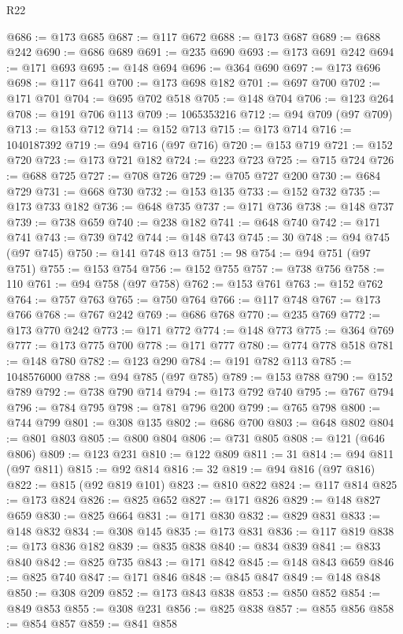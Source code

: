 \begin{lexlean}{R22}
\begin{coremodule}
@686 := @173 @685
@687 := @117 @672
@688 := @173 @687
@689 := @688 @242
@690 := @686 @689
@691 := @235 @690
@693 := @173 @691 @242
@694 := @171 @693
@695 := @148 @694
@696 := @364 @690
@697 := @173 @696
@698 := @117 @641
@700 := @173 @698 @182
@701 := @697 @700
@702 := @171 @701
@704 := @695 @702 @518
@705 := @148 @704
@706 := @123 @264
@708 := @191 @706 @113
@709 := 1065353216
@712 := @94 @709 (@97 @709)
@713 := @153 @712
@714 := @152 @713
@715 := @173 @714
@716 := 1040187392
@719 := @94 @716 (@97 @716)
@720 := @153 @719
@721 := @152 @720
@723 := @173 @721 @182
@724 := @223 @723
@725 := @715 @724
@726 := @688 @725
@727 := @708 @726
@729 := @705 @727 @200
@730 := @684 @729
@731 := @668 @730
@732 := @153 @135
@733 := @152 @732
@735 := @173 @733 @182
@736 := @648 @735
@737 := @171 @736
@738 := @148 @737
@739 := @738 @659
@740 := @238 @182
@741 := @648 @740
@742 := @171 @741
@743 := @739 @742
@744 := @148 @743
@745 := 30
@748 := @94 @745 (@97 @745)
@750 := @141 @748 @13
@751 := 98
@754 := @94 @751 (@97 @751)
@755 := @153 @754
@756 := @152 @755
@757 := @738 @756
@758 := 110
@761 := @94 @758 (@97 @758)
@762 := @153 @761
@763 := @152 @762
@764 := @757 @763
@765 := @750 @764
@766 := @117 @748
@767 := @173 @766
@768 := @767 @242
@769 := @686 @768
@770 := @235 @769
@772 := @173 @770 @242
@773 := @171 @772
@774 := @148 @773
@775 := @364 @769
@777 := @173 @775 @700
@778 := @171 @777
@780 := @774 @778 @518
@781 := @148 @780
@782 := @123 @290
@784 := @191 @782 @113
@785 := 1048576000
@788 := @94 @785 (@97 @785)
@789 := @153 @788
@790 := @152 @789
@792 := @738 @790 @714
@794 := @173 @792 @740
@795 := @767 @794
@796 := @784 @795
@798 := @781 @796 @200
@799 := @765 @798
@800 := @744 @799
@801 := @308 @135
@802 := @686 @700
@803 := @648 @802
@804 := @801 @803
@805 := @800 @804
@806 := @731 @805
@808 := @121 (@646 @806)
@809 := @123 @231
@810 := @122 @809
@811 := 31
@814 := @94 @811 (@97 @811)
@815 := @92 @814
@816 := 32
@819 := @94 @816 (@97 @816)
@822 := @815 (@92 @819 @101)
@823 := @810 @822
@824 := @117 @814
@825 := @173 @824
@826 := @825 @652
@827 := @171 @826
@829 := @148 @827 @659
@830 := @825 @664
@831 := @171 @830
@832 := @829 @831
@833 := @148 @832
@834 := @308 @145
@835 := @173 @831
@836 := @117 @819
@838 := @173 @836 @182
@839 := @835 @838
@840 := @834 @839
@841 := @833 @840
@842 := @825 @735
@843 := @171 @842
@845 := @148 @843 @659
@846 := @825 @740
@847 := @171 @846
@848 := @845 @847
@849 := @148 @848
@850 := @308 @209
@852 := @173 @843 @838
@853 := @850 @852
@854 := @849 @853
@855 := @308 @231
@856 := @825 @838
@857 := @855 @856
@858 := @854 @857
@859 := @841 @858

\end{coremodule}
\end{lexlean}
